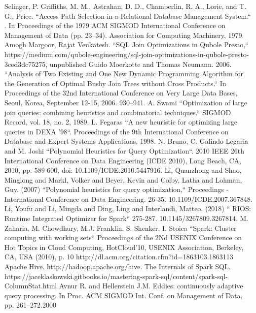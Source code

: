 \documentclass[conference]{IEEEtran}
\begin{document}
\begin{thebibliography}{00}
 Selinger, P. Griffiths, M. M., Astrahan, D. D., Chamberlin, R. A., Lorie, and T. G., Price. ``Access Path Selection in a Relational Database Management System.`` . In Proceedings of the 1979 ACM SIGMOD International Conference on Management of Data (pp. 23–34). Association for Computing Machinery, 1979.
 Amogh Margoor, Rajat Venkatesh. ``SQL Join Optimizations in Qubole Presto,``
https://medium.com/qubole-engineering/sql-join-optimizations-in-qubole-presto-3ced3dc75275, unpublished
 Guido Moerkotte and Thomas Neumann. 2006. ``Analysis of Two Existing and One New Dynamic Programming Algorithm for the Generation of Optimal Bushy Join Trees without Cross Products.`` In Proceedings of the 32nd International Conference on Very Large Data Bases, Seoul, Korea, September 12-15, 2006. 930–941.
 A. Swami ``Optimization of large join queries: combining heuristics and
combinatorial techniques.`` SIGMOD Record, vol. 18, no. 2, 1989.
 L. Fegaras ``A new heuristic for optimizing large queries in DEXA ’98``. Proceedings of the 9th International Conference on Database and Expert Systems Applications, 1998.
 N. Bruno, C. Galindo-Legaria and M. Joshi ``Polynomial Heuristics for Query Optimization``. 2010 IEEE 26th International Conference on Data Engineering (ICDE 2010), Long Beach, CA, 2010, pp. 589-600, doi: 10.1109/ICDE.2010.5447916.
 Li, Quanzhong and Shao, Minglong and Markl, Volker and Beyer, Kevin and Colby, Latha and Lohman, Guy. (2007)  ``Polynomial heuristics for query optimization,`` Proceedings - International Conference on Data Engineering. 26-35. 10.1109/ICDE.2007.367848.
 Li, Youfu and Li, Mingda and Ding, Ling and Interlandi, Matteo. (2018)  `` RIOS: Runtime Integrated Optimizer for Spark`` 275-287. 10.1145/3267809.3267814.
 M. Zaharia, M. Chowdhury, M.J. Franklin, S. Shenker, I. Stoica
``Spark: Cluster computing with working sets`` Proceedings of the 2Nd USENIX Conference on Hot Topics in Cloud Computing, HotCloud’10, USENIX Association, Berkeley, CA, USA (2010), p. 10 http://dl.acm.org/citation.cfm?id=1863103.1863113
 Apache Hive. http://hadoop.apache.org/hive.
 The Internals of Spark SQL. https://jaceklaskowski.gitbooks.io/mastering-spark-sql/content/spark-sql-ColumnStat.html
 Avnur R. and Hellerstein J.M. Eddies: continuously adaptive query processing. In Proc. ACM SIGMOD Int. Conf. on Management of Data, pp. 261–272.2000
\end{thebibliography}
\end{document}
